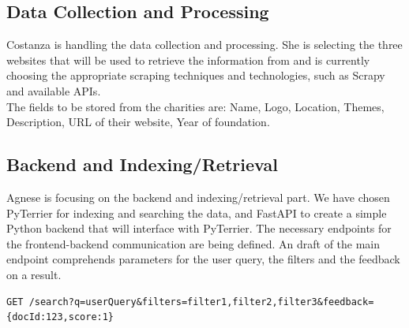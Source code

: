 \documentclass[unicode,9pt,a4paper,oneside,numbers=endperiod,openany]{scrartcl}
\begin{document}
\subsection{Data Collection and Processing}
Costanza is handling the data collection and processing.
She is selecting the three websites that will be used to retrieve the information from and is currently choosing the appropriate scraping techniques and technologies, such as Scrapy and available APIs.
\\
The fields to be stored from the charities are: Name, Logo, Location, Themes, Description, URL of their website, Year of foundation.

\subsection{Backend and Indexing/Retrieval}
Agnese is focusing on the backend and indexing/retrieval part.
We have chosen PyTerrier for indexing and searching the data, and FastAPI to create a simple Python backend that will interface with PyTerrier.
The necessary endpoints for the frontend-backend communication are being defined.
An draft of the main endpoint comprehends parameters for the user query, the filters and the feedback on a result.
\begin{verbatim}
GET /search?q=userQuery&filters=filter1,filter2,filter3&feedback={docId:123,score:1}
\end{verbatim}
\end{document}
